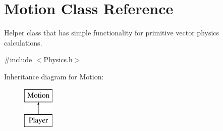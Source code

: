 \hypertarget{class_motion}{}\section{Motion Class Reference}
\label{class_motion}


Helper class that has simple functionality for primitive vector physics calculations.  




{\ttfamily \#include $<$Physics.\+h$>$}

Inheritance diagram for Motion\+:\begin{figure}[H]
\begin{center}
\leavevmode
\includegraphics[height=2.000000cm]{class_motion}
\end{center}
\end{figure}
